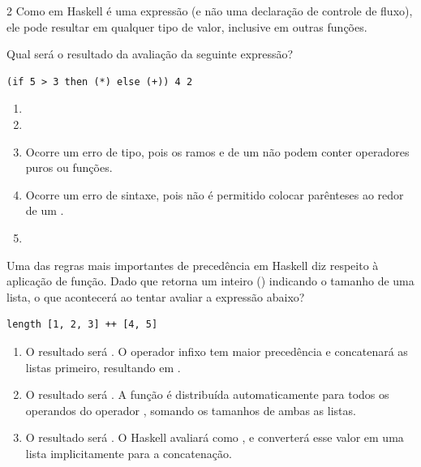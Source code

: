 \documentclass[a4paper,10pt,brazil]{article}
\begin{document}
\begin{multicols}{2}
Como  em Haskell é uma expressão (e não uma declaração de controle de fluxo), ele pode resultar em qualquer tipo de valor, inclusive em outras funções. 

Qual será o resultado da avaliação da seguinte expressão?
\begin{verbatim}
(if 5 > 3 then (*) else (+)) 4 2
\end{verbatim}

\begin{enumerate}
  \item {}

  \item {}

  \item Ocorre um erro de tipo, pois os ramos  e  de um  não podem conter operadores puros ou funções.

  \item Ocorre um erro de sintaxe, pois não é permitido colocar parênteses ao redor de um .

  \item {}


\end{enumerate}

Uma das regras mais importantes de precedência em Haskell diz respeito à aplicação de função. Dado que  retorna um inteiro () indicando o tamanho de uma lista, o que acontecerá ao tentar avaliar a expressão abaixo?
\begin{verbatim}
length [1, 2, 3] ++ [4, 5]
\end{verbatim}

\begin{enumerate}
  \item O resultado será . O operador infixo \haskellinline{++} tem maior precedência e concatenará as listas primeiro, resultando em .

  \item O resultado será . A função  é distribuída automaticamente para todos os operandos do operador \haskellinline{++}, somando os tamanhos de ambas as listas.

  \item O resultado será \haskellinline{[3, 4, 5]}. O Haskell avaliará  como , e converterá esse valor em uma lista implicitamente para a concatenação.


\end{enumerate}
\end{multicols}
\end{document}
